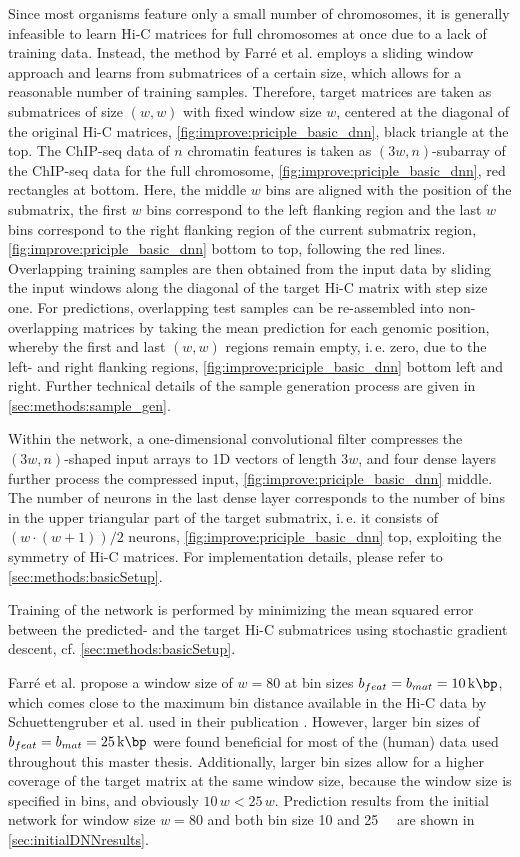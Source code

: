 Since most organisms feature only a small number of chromosomes, 
it is generally infeasible to learn Hi-C matrices for full chromosomes at once due to a lack of training data.
Instead, the method by Farr\'e et al. employs a sliding window approach and learns from submatrices of a certain size, 
which allows for a reasonable number of training samples.
Therefore, target matrices are taken as submatrices of size $(w, w)$ 
with fixed window size $w$, centered at the diagonal of the 
original Hi-C matrices, \cref{fig:improve:priciple_basic_dnn}, black triangle at the top.
The ChIP-seq data of $n$ chromatin features is taken as $(3w, n)$-subarray of the ChIP-seq data for the full chromosome, 
\cref{fig:improve:priciple_basic_dnn}, red rectangles at bottom. 
Here, the middle $w$ bins are aligned with the position of the submatrix,
the first $w$ bins correspond to the left flanking region and the last $w$ bins correspond to 
the right flanking region of the current submatrix region, \cref{fig:improve:priciple_basic_dnn} bottom to top, following the red lines. 
Overlapping training samples are then obtained from the input data by sliding 
the input windows along the diagonal of the target Hi-C matrix with step size one. 
For predictions, overlapping test samples can be re-assembled into non-overlapping matrices 
by taking the mean prediction for each genomic position, whereby the first and last $(w,w)$ regions remain
empty, i.\,e. zero, due to the left- and right flanking regions, \cref{fig:improve:priciple_basic_dnn} bottom left and right.
Further technical details of the sample generation process are given in \cref{sec:methods:sample_gen}.

Within the network, a one-dimensional convolutional filter compresses the $(3w, n)$-shaped input arrays to 1D vectors
of length $3w$, and four dense layers further process the compressed input, \cref{fig:improve:priciple_basic_dnn} middle.
The number of neurons in the last dense layer corresponds to the number of bins
in the upper triangular part of the target submatrix, i.\,e. it consists of $(w \cdot (w+1))/2$ neurons, \cref{fig:improve:priciple_basic_dnn} top, 
exploiting the symmetry of Hi-C matrices. 
For implementation details, please refer to \cref{sec:methods:basicSetup}.

Training of the network is performed by minimizing the mean squared error between the predicted-
and the target Hi-C submatrices using stochastic gradient descent, cf. \cref{sec:methods:basicSetup}.

Farr\'e et al. propose a window size of $w=80$ at bin sizes $b_{feat} = b_{mat} = \SI{10}{\kilo\bp}$,
which comes close to the maximum bin distance available in the Hi-C data by Schuettengruber et al. \cite{Schuettengruber2014} used in their publication \cite{Farre2018a}.
However, larger bin sizes of $b_{feat} = b_{mat} = \SI{25}{\kilo\bp}$ were found beneficial for 
most of the (human) data used throughout this master thesis.
Additionally, larger bin sizes allow for a higher coverage of the target matrix at the same window size,
because the window size is specified in bins, and obviously $10\, w < 25\, w$.
Prediction results from the initial network for window size $w=80$ and both bin size 10 and \SI{25}{\kilo\bp} are shown in \cref{sec:initialDNNresults}.

